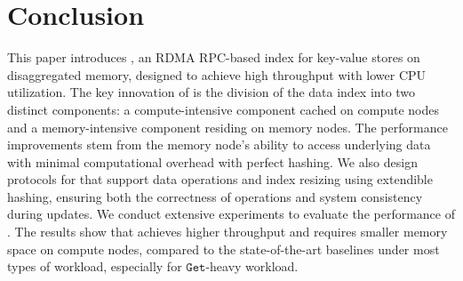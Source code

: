 \vspace{-1.5ex}
\section{Conclusion}
\label{sec:conclusion}
\vspace{-.5ex}
This paper introduces \sys, an RDMA RPC-based index for key-value stores on disaggregated memory, designed to achieve high throughput with lower CPU utilization. 
The key innovation of \sys is the division of the data index into two distinct components: a compute-intensive component cached on compute nodes and a memory-intensive component residing on memory nodes. The performance improvements stem from the memory node's ability to access underlying data with minimal computational overhead with perfect hashing.
We also design protocols for \sys that support data operations and index resizing using extendible hashing, ensuring both the correctness of operations and system consistency during updates.
We conduct extensive experiments to evaluate the performance of \sys. The results show that \sys achieves higher throughput and requires smaller memory space on compute nodes, compared to the state-of-the-art baselines under most types of workload, especially for $\mathtt{Get}$-heavy workload. 







\iffalse
It successfully resolves the limitations of existing which leverages minimal perfect hashing to decouple data lookup computation for disaggregated KVS based on two-sided RDMA primitives with limited remote CPU resources.
Unlike the traditional RPC-based approaches, our scheme making memory nodes delivers high throughput by offloading as much computation of the data lookup service as possible to compute nodes. The memory nodes focus on memory access without extra computation. 
\sys can also be regarded as an effective tradeoff between one-sided RDMA and RPC-based schemes.
Moreover, we explored the in-place insert for MPH buckets to reduce times for hash table resizing and try to use the MPH space fully. We also designed the partial buckets lock scheme and collaborated seeds fetching to support concurrent data lookup during resizing. Extensive experimental results show that \sys outperforms other baselines (both one-sided RDMA or RPC-based) by up to 1.53$\times$ in full read workload with limited memory node CPU resources and less memory usage on the client side.
\fi